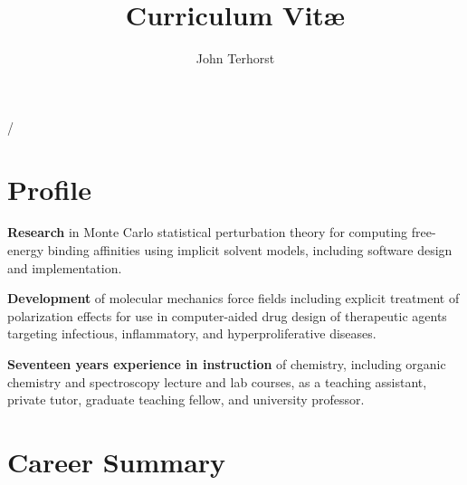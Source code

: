 \documentclass[10pt]{article}
\author{John Terhorst}
\title{Curriculum Vit\ae}
\makeatletter
\def\mycolor{myRed}%
\def\position{Adjunct Assistant Professor of Chemistry}
\def\currempl{Vanguard University of Southern California}
\def\address{55 Fair Drive, Costa Mesa, California 92626}
\def\dept{Dept.\ of Natural Sciences and Mathematics}
\renewcommand{\maketitle}{
			{\huge{\color{\mycolor}\textbf{\theauthor}} / \hspace{-0.5mm}\thetitle}

			\position\ / \dept \\
			\currempl\ / \address

			\vspace*{0pt}
			}
\def\address{26 Kendall Avenue, Redlands, California 92373}
\def\phone{562.458.8254}
\def\mymail{\email{john@johnterhorst.com}}
\renewcommand{\maketitle}{
			{\huge{\color{\mycolor}\textbf{\theauthor}} / \hspace{-0.5mm}\thetitle}

			\position\ / \currempl \\
			\address\ / \phone\ / \mymail 

			\vspace*{0pt}
			}
\renewcommand{\maketitle}{
			{\huge{\color{\mycolor}\textbf{\theauthor}} / \hspace{-0.5mm}\thetitle}
			\vspace*{12pt}
			}
\newcommand*\email[1]{\href{mailto:#1}{#1}}
\newcommand*\paritem[2]{\textbf{#1} #2}
\makeatother
\begin{document}

\maketitle


\section{Profile}


\paritem{Research} {in Monte Carlo statistical perturbation theory for computing free-energy binding affinities using implicit solvent models, including software design and implementation.} 

\paritem{Development} {of molecular mechanics force fields including explicit treatment of polarization effects for use in computer-aided drug design of therapeutic agents targeting infectious, inflammatory, and hyperproliferative diseases.} 

\paritem{Seventeen years experience in instruction} {of chemistry, including organic chemistry and spectroscopy lecture and lab courses, as a teaching assistant, private tutor, graduate teaching fellow, and university professor.}



\section{Career Summary}
\end{document}
